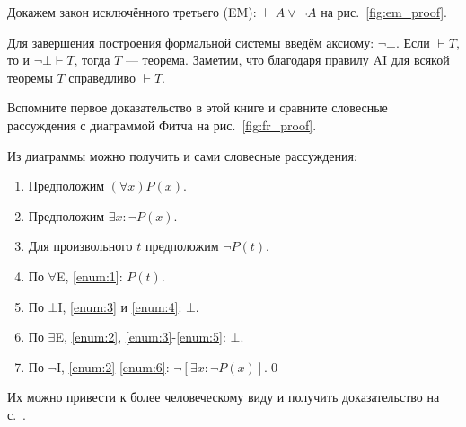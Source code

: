 Докажем закон исключённого третьего (EM): $\vdash A\lor \lnot A$ на
рис.~\ref{fig:em_proof}.

Для завершения построения формальной системы
введём аксиому: $\lnot\bot$. Если $\vdash T$, то и $\lnot\bot\vdash T$,
тогда $T$ --- теорема. Заметим, что благодаря правилу AI для всякой
теоремы $T$ справедливо $\vdash T$.

Вспомните первое доказательство в этой книге и
сравните словесные рассуждения с
диаграммой Фитча на рис.~\ref{fig:fr_proof}.

Из диаграммы можно получить и сами словесные рассуждения:
\begin{enumerate}[label=(\arabic*)]
	\item{}Предположим $(\forall x)P(x)$.\label{enum:1}
	\item{}Предположим $\exists x:\lnot P(x)$.\label{enum:2}
	\item{}Для произвольного $t$ предположим $\lnot P(t)$.\label{enum:3}
	\item{}По $\forall$E, \ref{enum:1}: $P(t)$.\label{enum:4}
	\item{}По $\bot$I, \ref{enum:3} и \ref{enum:4}: $\bot$.\label{enum:5}
	\item{}По $\exists$E, \ref{enum:2}, \ref{enum:3}-\ref{enum:5}: $\bot$.\label{enum:6}
	\item{}По $\lnot$I, \ref{enum:2}-\ref{enum:6}: $\lnot[\exists x:\lnot P(x)]$.\qed
\end{enumerate}

Их можно привести к более человеческому виду и получить доказательство на
с.~\pageref{wordproof}.

